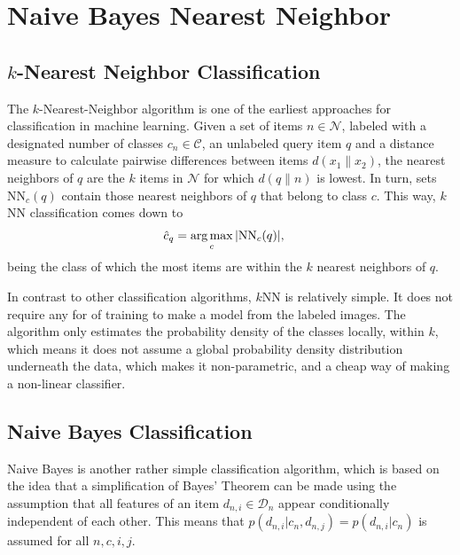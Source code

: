 \section{Naive Bayes Nearest Neighbor} %
\label{cha:naive_bayes_nearest_neighbor}


\subsection{$k$-Nearest Neighbor Classification} %
\label{sub:_k_nearest_neighbor}

The $k$-Nearest-Neighbor algorithm is one of the earliest approaches for classification in machine learning. Given a set of items $n \in \mathcal{N}$, labeled with a designated number of classes $c_n \in \mathcal{C}$, an unlabeled query item $q$ and a distance measure to calculate pairwise differences between items $d(x_1\|x_2)$, the nearest neighbors of $q$ are the $k$ items in $\mathcal{N}$ for which $d(q\|n)$ is lowest. In turn, sets $\text{NN}_c(q)$ contain those nearest neighbors of $q$ that belong to class $c$. This way, $k$NN classification comes down to
\begin{align}
    \hat c_q &= \operatorname*{arg\,max}_c |\text{NN}_c(q)|,
\end{align}
being the class of which the most items are within the $k$ nearest neighbors of $q$.

In contrast to other classification algorithms, $k$NN is relatively simple. It does not require any for of training to make a model from the labeled images. The algorithm only estimates the probability density of the classes locally, within $k$, which means it does not assume a global probability density distribution underneath the data, which makes it non-parametric, and a cheap way of making a non-linear classifier.

\subsection{Naive Bayes Classification} %
\label{sub:NB}

Naive Bayes is another rather simple classification algorithm, which is based on the idea that a simplification of Bayes' Theorem can be made using the assumption that all features of an item $d_{n,i} \in \mathcal{D}_n$ appear conditionally independent of each other. This means that $p(d_{n,i} | c_n, d_{n,j}) = p(d_{n,i}|c_n)$ is assumed for all $n,c,i,j$. 

